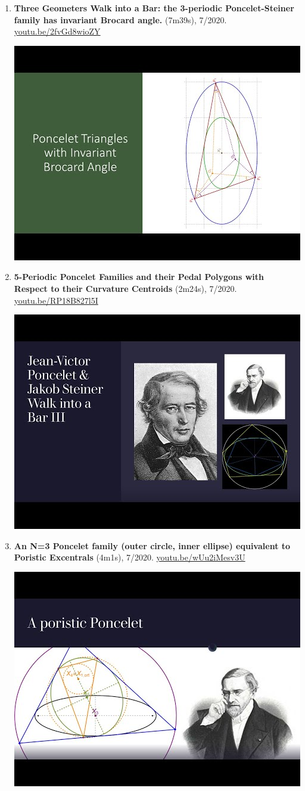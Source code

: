 \documentclass[12pt]{article}
\begin{document}
\begin{enumerate}[resume]
% 
\item \textbf{Three Geometers Walk into a Bar: the 3-periodic Poncelet-Steiner family has invariant Brocard angle.} (7m39s), 7/2020. \href{https://youtu.be/2fvGd8wioZY}{\url{youtu.be/2fvGd8wioZY}}
\begin{center}\includegraphics[width=.5\textwidth]{pics/2fvGd8wioZY.jpg}\end{center}
% 
\item \textbf{5-Periodic Poncelet Families and their Pedal Polygons with Respect to their Curvature Centroids} (2m24s), 7/2020. \href{https://youtu.be/RP18B827l5I}{\url{youtu.be/RP18B827l5I}}
\begin{center}\includegraphics[width=.5\textwidth]{pics/RP18B827l5I.jpg}\end{center}
% 
\item \textbf{An N=3 Poncelet family (outer circle, inner ellipse) equivalent to Poristic Excentrals} (4m1s), 7/2020. \href{https://youtu.be/wUu2iMesv3U}{\url{youtu.be/wUu2iMesv3U}}
\begin{center}\includegraphics[width=.5\textwidth]{pics/wUu2iMesv3U.jpg}\end{center}

\end{enumerate}
\end{document}

